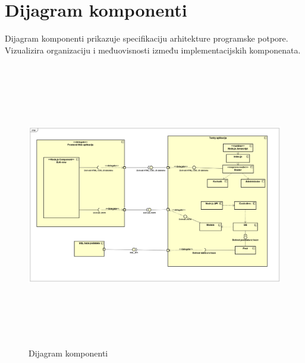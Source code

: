 		\newpage
		\section{Dijagram komponenti}
			
			 {Dijagram komponenti prikazuje specifikaciju arhitekture programske potpore. Vizualizira organizaciju i međuovisnosti između implementacijskih komponenata. }
			 
			 \begin{figure}[h]
			 	\centering
			 	\includegraphics[width=17.5cm,height=12.5cm]{Component Diagram0}
			 	\caption{Dijagram komponenti}
			 	\label{fig:cmp}
			 \end{figure}